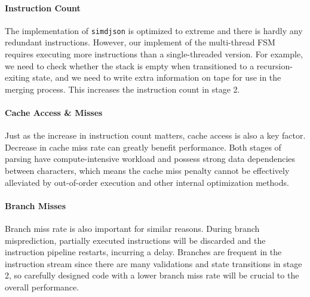 \documentclass[11pt]{article}
\begin{document}
\paragraph{Instruction Count} The implementation of \texttt{simdjson} is optimized to extreme and there is hardly any redundant instructions. However, our implement of the multi-thread FSM requires executing more instructions than a single-threaded version. For example, we need to check whether the stack is empty when transitioned to a recursion-exiting state, and we need to write extra information on tape for use in the merging process. This increases the instruction count in stage 2.

\paragraph{Cache Access \& Misses} Just as the increase in instruction count matters, cache access is also a key factor. Decrease in cache miss rate can greatly benefit performance. Both stages of parsing have compute-intensive workload and possess strong data dependencies between characters, which means the cache miss penalty cannot be effectively alleviated by out-of-order execution and other internal optimization methods.

\paragraph{Branch Misses} Branch miss rate is also important for similar reasons. During branch misprediction, partially executed instructions will be discarded and the instruction pipeline restarts, incurring a delay. Branches are frequent in the instruction stream since there are many validations and state transitions in stage 2, so carefully designed code with a lower branch miss rate will be crucial to the overall performance.

\begin{table}[]
    \centering
    \caption{Performance details on \texttt{citylots} with Intel i5-6200U 2.3GHz CPU (Skylake). Stage 2 statistics for MercuryJson evaluated on a single thread due to measurement limitations.}
    \label{tab:perf_detail}
\end{table}
\end{document}
